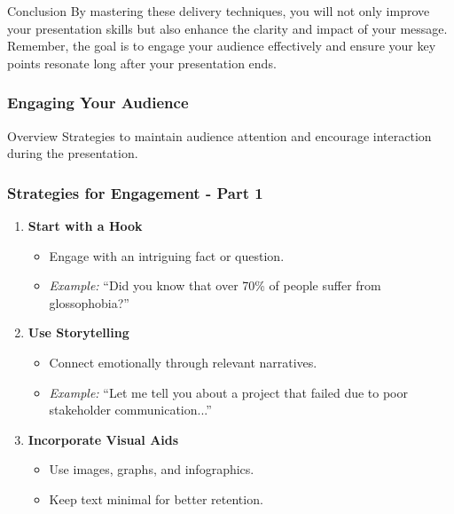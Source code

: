 \documentclass[aspectratio=169]{beamer}
\begin{document}
\begin{frame}[fragile]{Conclusion}
  By mastering these delivery techniques, you will not only improve your presentation skills but also enhance the clarity and impact of your message. Remember, the goal is to engage your audience effectively and ensure your key points resonate long after your presentation ends.
\end{frame}

\begin{frame}[fragile]
    \frametitle{Engaging Your Audience}
    \begin{block}{Overview}
        Strategies to maintain audience attention and encourage interaction during the presentation.
    \end{block}
\end{frame}

\begin{frame}[fragile]
    \frametitle{Strategies for Engagement - Part 1}
    \begin{enumerate}
        \item \textbf{Start with a Hook}
            \begin{itemize}
                \item Engage with an intriguing fact or question.
                \item \textit{Example:} “Did you know that over 70\% of people suffer from glossophobia?”
            \end{itemize}
        \item \textbf{Use Storytelling}
            \begin{itemize}
                \item Connect emotionally through relevant narratives.
                \item \textit{Example:} “Let me tell you about a project that failed due to poor stakeholder communication...”
            \end{itemize}
        \item \textbf{Incorporate Visual Aids}
            \begin{itemize}
                \item Use images, graphs, and infographics.
                \item Keep text minimal for better retention.
            \end{itemize}
    \end{enumerate}
\end{frame}
\end{document}
